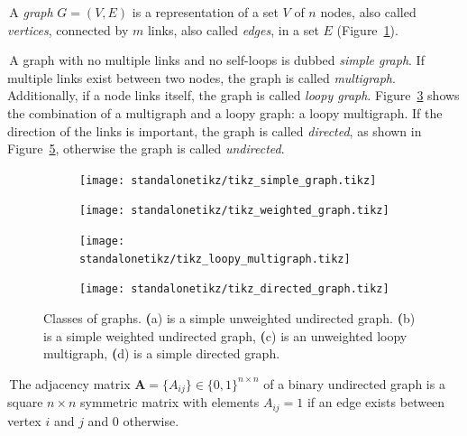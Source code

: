 \documentclass[11pt,              a4paper,              twoside,openright,              titlepage,              headinclude,footinclude,                            numbers=noenddot,              cleardoublepage=empty,]{scrreprt}
\begin{document}
\noindent\textbullet \,A \emph{graph} $G=(V,E)$ is a representation of a set $V$ of $n$ nodes, also called \emph{vertices}, connected by $m$ links, also called \emph{edges}, in a set $E$ (Figure~\ref{fig:simple_unweighted_graph}).

\noindent\textbullet \,A graph with no multiple links and no self-loops is dubbed \emph{simple graph}.
If multiple links exist between two nodes, the graph is called \emph{multigraph}.
Additionally, if a node links itself, the graph is called \emph{loopy graph}.
Figure~\ref{fig:loopy_multigraph} shows the combination of a multigraph and a loopy graph: a loopy multigraph.
If the direction of the links is important, the graph is called \emph{directed}, as shown in Figure~\ref{fig:directedgraph}, otherwise the graph is called \emph{undirected}.

\begin{figure}[htb!]
\centering
    \begin{subfigure}[hb]{0.4\textwidth}\centering
        \texttt{[image: standalonetikz/tikz\_simple\_graph.tikz]}
        \caption{}
        \label{fig:simple_unweighted_graph}
    \end{subfigure}
    \begin{subfigure}[hb]{0.4\textwidth}\centering
    \texttt{[image: standalonetikz/tikz\_weighted\_graph.tikz]}
    \caption{}
    \label{fig:simple_weighted_graph}
    \end{subfigure}
    \begin{subfigure}[hb]{0.4\textwidth}\centering
    \texttt{[image: standalonetikz/tikz\_loopy\_multigraph.tikz]}
    \caption{}
    \label{fig:loopy_multigraph}
    \end{subfigure}
    \begin{subfigure}[hb]{0.4\textwidth}\centering
    \texttt{[image: standalonetikz/tikz\_directed\_graph.tikz]}
    \caption{}
    \label{fig:directedgraph}
    \end{subfigure}
    \caption{Classes of graphs.
{\textbf (a)} is a simple unweighted undirected graph.
{\textbf (b)} is a simple weighted undirected graph, {\textbf (c)} is an unweighted loopy multigraph, {\textbf (d)} is a simple directed graph.}
\end{figure}

\noindent\textbullet \,The adjacency matrix $\mathbf{A}=\{A_{ij}\} \in \{0,1\}^{n \times n}$ of a binary undirected graph is a square $n\times n$ symmetric matrix with elements $A_{ij}=1$ if an edge exists between vertex $i$ and $j$ and $0$ otherwise.
\end{document}
